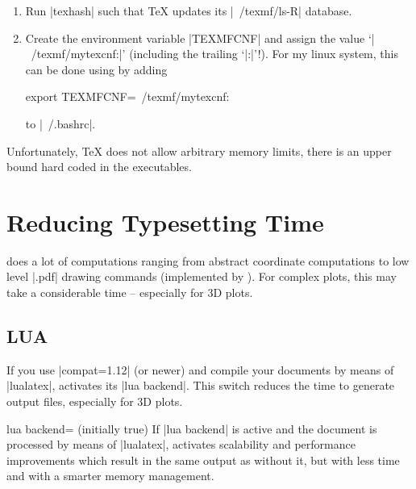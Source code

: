 {\begin{enumerate}
\begin{codeexample}[code only]
\end{codeexample}
    \item Run |texhash| such that \TeX{} updates its |~/texmf/ls-R| database.
    \item Create the environment variable |TEXMFCNF| and assign the value
        `|~/texmf/mytexcnf:|' (including the trailing `|:|'!). For my linux
        system, this can be done using by adding
\begin{codeexample}
export TEXMFCNF=~/texmf/mytexcnf:
\end{codeexample}
        to |~/.bashrc|.
\end{enumerate}

Unfortunately, \TeX{} does not allow arbitrary memory limits, there is an upper
bound hard coded in the executables.


\section{Reducing Typesetting Time}

\PGFPlots{} does a lot of computations ranging from abstract coordinate
computations to low level |.pdf| drawing commands (implemented by \PGF{}). For
complex plots, this may take a considerable time -- especially for 3D plots.


\subsection{LUA}

If you use |compat=1.12| (or newer) and compile your documents by means of
|lualatex|, \PGFPlots{} activates its |lua backend|. This switch reduces the
time to generate output files, especially for 3D plots.

\begin{pgfplotskey}{lua backend= (initially true)}
    If |lua backend| is active and the document is processed by means of
    |lualatex|, \PGFPlots{} activates scalability and performance improvements
    which result in the same output as without it, but with less time and with
    a smarter memory management.


\end{pgfplotskey}}
